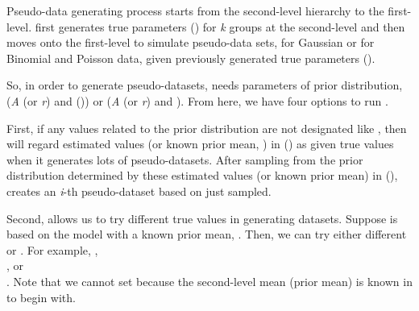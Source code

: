 \documentclass[a4paper]{book}
\begin{document}
\begin{Details}
Pseudo-data generating process starts from the second-level hierarchy to the first-level.  first generates true parameters () for \emph{k} groups at the second-level and then moves onto the first-level to simulate pseudo-data sets,  for Gaussian or  for Binomial and Poisson data, given previously generated true parameters (). 

So, in order to generate pseudo-datasets,  needs parameters of prior distribution,  
(\emph{A} (or \emph{r}) and \eqn{\beta}{} ()) 
or (\emph{A} (or \emph{r}) and ). From here, we have four options to run .

First, if any values related to the prior distribution are not designated like 
, then  will regard estimated values (or known prior mean, ) in  () as given true values when it generates lots of pseudo-datasets. After sampling  from the prior distribution determined by these estimated values (or known prior mean) in  (),  creates an \emph{i}-th pseudo-dataset based on  just sampled.

Second,  allows us to try different true values in generating datasets. Suppose  is based on the model with a known prior mean, . Then, we can try either different  or . For example, , \\{}
, or \\{}
. Note that we cannot set  because the second-level mean (prior mean) is known in  to begin with.


\end{Details}
\end{document}
